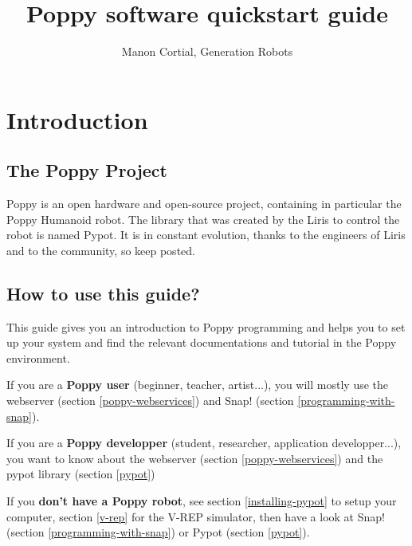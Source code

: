 \documentclass{article}
\begin{document}
\title{Poppy software quickstart guide}
\author{Manon Cortial, Generation Robots}

\maketitle


\section{Introduction}

\subsection{The Poppy Project}

Poppy is an open hardware and open-source project, containing in particular the Poppy Humanoid robot. The library that was created by the Liris to control the robot is named Pypot. It is in constant evolution, thanks to the engineers of Liris and to the community, so keep posted.



\subsection{How to use this guide?}

This guide gives you an introduction to Poppy programming and helps you to set up your system and find the relevant documentations and tutorial in the Poppy environment.

If you are a \textbf{Poppy user} (beginner, teacher, artist...), you will mostly use the webserver (section \ref{poppy-webservices}) and Snap! (section \ref{programming-with-snap}).

If you are a \textbf{Poppy developper} (student, researcher, application developper...), you want to know about the webserver (section \ref{poppy-webservices}) and the pypot library (section \ref{pypot})

If you \textbf{don't have a Poppy robot}, see section \ref{installing-pypot} to setup your computer, section \ref{v-rep} for the V-REP simulator, then have a look at Snap! (section \ref{programming-with-snap}) or Pypot (section \ref{pypot}).
\end{document}
